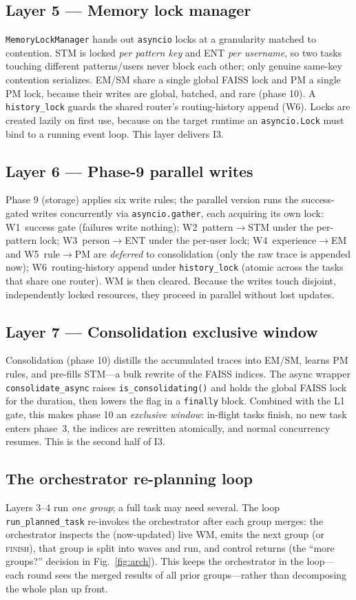 \documentclass[10pt,twocolumn]{article}
\newcommand{\code}[1]{\texttt{\small #1}}
\begin{document}
\subsection{Layer 5 --- Memory lock manager}
\code{MemoryLockManager} hands out \code{asyncio} locks at a granularity matched
to contention. STM is locked \emph{per pattern key} and ENT \emph{per username},
so two tasks touching different patterns/users never block each other; only
genuine same-key contention serializes. EM/SM share a single global FAISS lock
and PM a single PM lock, because their writes are global, batched, and rare
(phase 10). A \code{history\_lock} guards the shared router's routing-history
append (W6). Locks are created lazily on first use, because on the target
runtime an \code{asyncio.Lock} must bind to a running event loop. This layer
delivers \textsc{I3}.

\subsection{Layer 6 --- Phase-9 parallel writes}
Phase 9 (storage) applies six write rules; the parallel version runs the
success-gated writes concurrently via \code{asyncio.gather}, each acquiring its
own lock:
W1~success gate (failures write nothing);
W2~pattern$\to$STM under the per-pattern lock;
W3~person$\to$ENT under the per-user lock;
W4~experience$\to$EM and W5~rule$\to$PM are \emph{deferred} to consolidation
(only the raw trace is appended now);
W6~routing-history append under \code{history\_lock} (atomic across the tasks
that share one router). WM is then cleared. Because the writes touch disjoint,
independently locked resources, they proceed in parallel without lost updates.

\subsection{Layer 7 --- Consolidation exclusive window}
Consolidation (phase 10) distills the accumulated traces into EM/SM, learns PM
rules, and pre-fills STM---a bulk rewrite of the FAISS indices. The async
wrapper \code{consolidate\_async} raises \code{is\_consolidating()} and holds the
global FAISS lock for the duration, then lowers the flag in a \code{finally}
block. Combined with the L1 gate, this makes phase 10 an \emph{exclusive
window}: in-flight tasks finish, no new task enters phase~3, the indices are
rewritten atomically, and normal concurrency resumes. This is the second half of
\textsc{I3}.

\subsection{The orchestrator re-planning loop}
Layers 3--4 run \emph{one group}; a full task may need several. The loop
\code{run\_planned\_task} re-invokes the orchestrator after each group merges:
the orchestrator inspects the (now-updated) live WM, emits the next group (or
\textsc{finish}), that group is split into waves and run, and control returns
(the ``more groups?'' decision in Fig.~\ref{fig:arch}). This keeps the
orchestrator in the loop---each round sees the merged results of all prior
groups---rather than decomposing the whole plan up front.
\end{document}
